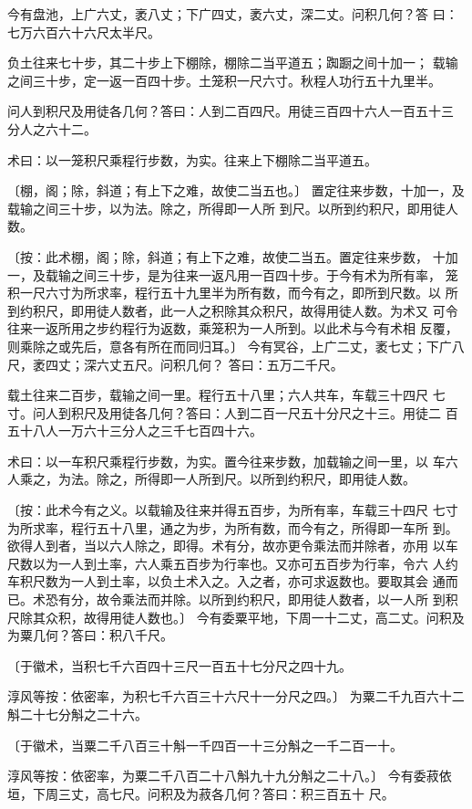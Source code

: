 \documentclass[12pt,UTF8]{ctexbook}
\begin{document}
今有盘池，上广六丈，袤八丈；下广四丈，袤六丈，深二丈。问积几何？答 曰：七万六百六十六尺太半尺。

负土往来七十步，其二十步上下棚除，棚除二当平道五；踟蹰之间十加一； 载输之间三十步，定一返一百四十步。土笼积一尺六寸。秋程人功行五十九里半。

问人到积尺及用徒各几何？答曰：人到二百四尺。用徒三百四十六人一百五十三 分人之六十二。

术曰：以一笼积尺乘程行步数，为实。往来上下棚除二当平道五。

〔棚，阁；除，斜道；有上下之难，故使二当五也。〕 置定往来步数，十加一，及载输之间三十步，以为法。除之，所得即一人所 到尺。以所到约积尺，即用徒人数。

〔按：此术棚，阁；除，斜道；有上下之难，故使二当五。置定往来步数， 十加一，及载输之间三十步，是为往来一返凡用一百四十步。于今有术为所有率， 笼积一尺六寸为所求率，程行五十九里半为所有数，而今有之，即所到尺数。以 所到约积尺，即用徒人数者，此一人之积除其众积尺，故得用徒人数。为术又 可令往来一返所用之步约程行为返数，乘笼积为一人所到。以此术与今有术相 反覆，则乘除之或先后，意各有所在而同归耳。〕 今有冥谷，上广二丈，袤七丈；下广八尺，袤四丈；深六丈五尺。问积几何？ 答曰：五万二千尺。

载土往来二百步，载输之间一里。程行五十八里；六人共车，车载三十四尺 七寸。问人到积尺及用徒各几何？答曰：人到二百一尺五十分尺之十三。用徒二 百五十八人一万六十三分人之三千七百四十六。

术曰：以一车积尺乘程行步数，为实。置今往来步数，加载输之间一里，以 车六人乘之，为法。除之，所得即一人所到尺。以所到约积尺，即用徒人数。

〔按：此术今有之义。以载输及往来并得五百步，为所有率，车载三十四尺 七寸为所求率，程行五十八里，通之为步，为所有数，而今有之，所得即一车所 到。欲得人到者，当以六人除之，即得。术有分，故亦更令乘法而并除者，亦用 以车尺数以为一人到土率，六人乘五百步为行率也。又亦可五百步为行率，令六 人约车积尺数为一人到土率，以负土术入之。入之者，亦可求返数也。要取其会 通而已。术恐有分，故令乘法而并除。以所到约积尺，即用徒人数者，以一人所 到积尺除其众积，故得用徒人数也。〕 今有委粟平地，下周一十二丈，高二丈。问积及为粟几何？答曰：积八千尺。

〔于徽术，当积七千六百四十三尺一百五十七分尺之四十九。

淳风等按：依密率，为积七千六百三十六尺十一分尺之四。〕 为粟二千九百六十二斛二十七分斛之二十六。

〔于徽术，当粟二千八百三十斛一千四百一十三分斛之一千二百一十。

淳风等按：依密率，为粟二千八百二十八斛九十九分斛之二十八。〕 今有委菽依垣，下周三丈，高七尺。问积及为菽各几何？答曰：积三百五十 尺。
\end{document}
